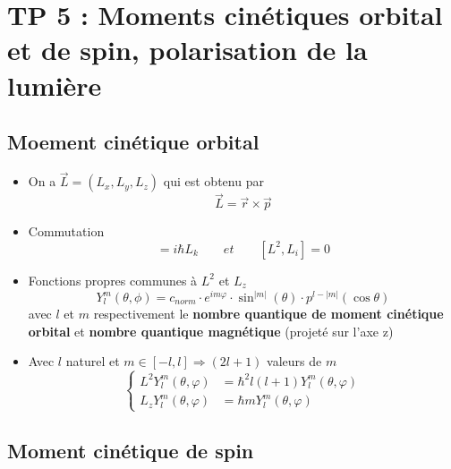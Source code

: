 
\section*{TP 5 : Moments cinétiques orbital et de spin, polarisation de la lumière}

\subsection*{Moement cinétique orbital}
\begin{itemize}
	\item On a $\vec{L} = (L_x,L_y,L_z)$ qui est obtenu par
	      \begin{equation}
	      	\vec{L} = \vec{r} \times \vec{p}
	      \end{equation}
	      		
	\item Commutation
	      \begin{equation}
	      	[L_i,L_j] = i\hbar L_k \qquad et \qquad[L^2,L_i] = 0
	      \end{equation}
	      	
	\item Fonctions propres communes à $L^2$ et $L_z$
	      \begin{equation}
	      	Y^m_l (\theta , \phi ) = c_{norm} \cdot e^{im \varphi } \cdot \sin ^{|m|}(\theta ) \cdot p^{l-|m|}(\cos \theta )
	      \end{equation}
	      avec $l$ et $m$ respectivement le \textbf{nombre quantique de moment cinétique orbital} et \textbf{nombre quantique magnétique} (projeté sur l'axe z)
	      		
	\item Avec $l$ naturel et $m \in [-l,l] \Rightarrow (2l+1)$ valeurs de $m$
	      \begin{equation}
	      	\left\{
	      	\begin{aligned}
	      		L^2 Y^m_l (\theta , \varphi ) & = \hbar ^2 l(l+1) Y^m_l (\theta , \varphi ) \\
	      		L_z Y^m_l (\theta , \varphi ) & = \hbar m Y^m_l (\theta , \varphi )         
	      	\end{aligned}
	      	\right.
	      \end{equation}
\end{itemize}

\subsection*{Moment cinétique de spin}

